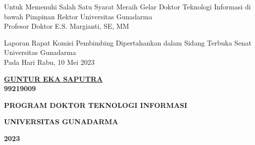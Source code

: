 \begin{center}
\vspace{0.5cm}

Untuk Memenuhi Salah Satu Syarat Meraih Gelar Doktor Teknologi Informasi di bawah Pimpinan Rektor Universitas Gunadarma \\ Profesor Doktor E.S. Margianti, SE, MM

\vspace{1.5cm}

Laporan Rapat Komisi Pembimbing
Dipertahankan dalam Sidang Terbuka Senat Universitas Gunadarma\\
Pada Hari Rabu, 10 Mei 2023

\vspace{1cm}

{\large \underline{\textbf{{GUNTUR EKA SAPUTRA}}}\\

 \vspace{0.1cm}\textbf{99219009}}


\vspace{1cm}


{\fontsize{12}{48} \selectfont \textbf{PROGRAM DOKTOR TEKNOLOGI INFORMASI}}%

{\fontsize{12}{48} \selectfont \textbf{UNIVERSITAS GUNADARMA}} %

{\fontsize{12}{48} \selectfont \textbf{2023}}

\end{center} 

